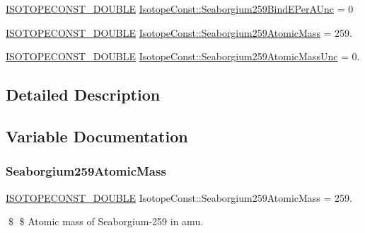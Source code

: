 \begin{DoxyCompactItemize}
\mbox{\hyperlink{group___isotope_const-_macros_ga8f45a7272ce02c0b4c65c44636ed719a}{I\+S\+O\+T\+O\+P\+E\+C\+O\+N\+S\+T\+\_\+\+D\+O\+U\+B\+LE}} \mbox{\hyperlink{group___isotope_const-_seaborgium-_sg259_ga340130910e1196253e64f804a797fab7}{Isotope\+Const\+::\+Seaborgium259\+Bind\+E\+Per\+A\+Unc}} = 0
\item 
\mbox{\hyperlink{group___isotope_const-_macros_ga8f45a7272ce02c0b4c65c44636ed719a}{I\+S\+O\+T\+O\+P\+E\+C\+O\+N\+S\+T\+\_\+\+D\+O\+U\+B\+LE}} \mbox{\hyperlink{group___isotope_const-_seaborgium-_sg259_ga45b1384ba9b3e9da853d8573b141eb1f}{Isotope\+Const\+::\+Seaborgium259\+Atomic\+Mass}} = 259.
\item 
\mbox{\hyperlink{group___isotope_const-_macros_ga8f45a7272ce02c0b4c65c44636ed719a}{I\+S\+O\+T\+O\+P\+E\+C\+O\+N\+S\+T\+\_\+\+D\+O\+U\+B\+LE}} \mbox{\hyperlink{group___isotope_const-_seaborgium-_sg259_ga4615491b6f8261aad41507bd42c60f1c}{Isotope\+Const\+::\+Seaborgium259\+Atomic\+Mass\+Unc}} = 0.
\end{DoxyCompactItemize}


\subsection{Detailed Description}


\subsection{Variable Documentation}
\mbox{\label{group___isotope_const-_seaborgium-_sg259_ga45b1384ba9b3e9da853d8573b141eb1f}} 
\subsubsection{\texorpdfstring{Seaborgium259\+Atomic\+Mass}{Seaborgium259AtomicMass}}
{\footnotesize\ttfamily \mbox{\hyperlink{group___isotope_const-_macros_ga8f45a7272ce02c0b4c65c44636ed719a}{I\+S\+O\+T\+O\+P\+E\+C\+O\+N\+S\+T\+\_\+\+D\+O\+U\+B\+LE}} Isotope\+Const\+::\+Seaborgium259\+Atomic\+Mass = 259.}

\$ \$ Atomic mass of Seaborgium-\/259 in amu. \mbox{\label{group___isotope_const-_seaborgium-_sg259_ga4615491b6f8261aad41507bd42c60f1c}} 
